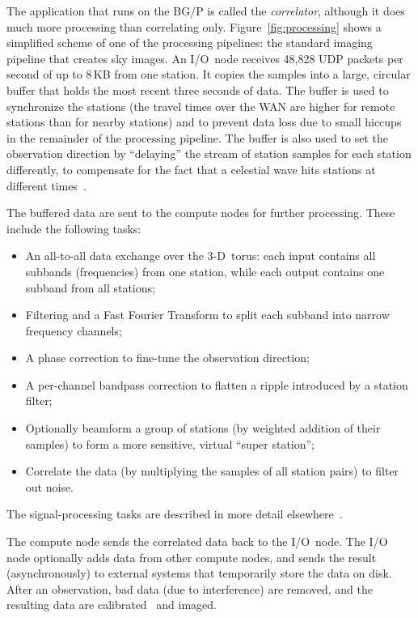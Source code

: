 \documentclass[journal]{IEEEtran}
\begin{document}
The application that runs on the BG/P is called the \emph{correlator},
although it does much more processing than correlating only.
Figure~\ref{fig:processing} shows a simplified scheme of one of the processing
pipelines: the standard imaging pipeline that creates sky images.
An I/O~node receives 48,828 UDP packets per second of up to 8\,KB from one
station.
It copies the samples into a large, circular buffer that holds the most recent
three seconds of data.
The buffer is used to synchronize the stations (the travel times over the
WAN are higher for remote stations than for nearby stations) and to prevent
data loss due to small hiccups in the remainder of the processing pipeline.
The buffer is also used to set the observation direction by ``delaying''
the stream of station samples for each station differently, to compensate for
the fact that a celestial wave hits stations at different
times~\cite[Sec.~2.1]{Romein:06}.

The buffered data are sent to the compute nodes for further processing.
These include the following tasks:
\begin{itemize}
\item	An all-to-all data exchange over the 3-D~torus: each input contains all
	subbands (frequencies) from one station, while each output contains
	one subband from all stations;
\item	Filtering and a Fast Fourier Transform to split each subband into
	narrow frequency channels;
\item	A phase correction to fine-tune the observation direction;
\item	A per-channel bandpass correction to flatten a ripple introduced by
	a station filter;
\item	Optionally beamform a group of stations (by weighted addition of their
	samples) to form a more sensitive, virtual ``super station'';
\item	Correlate the data (by multiplying the samples of all station pairs)
	to filter out noise.
\end{itemize}
The signal-processing tasks are described in more detail
elsewhere~\cite[Sec.~2]{Romein:06}.

The compute node sends the correlated data back to the I/O~node.
The I/O node optionally adds data from other compute nodes, and sends the
result (asynchronously) to external systems that temporarily store the data
on disk.
After an observation, bad data (due to interference) are removed, and the
resulting data are calibrated~\cite{Nijboer:07} and imaged.
\end{document}
